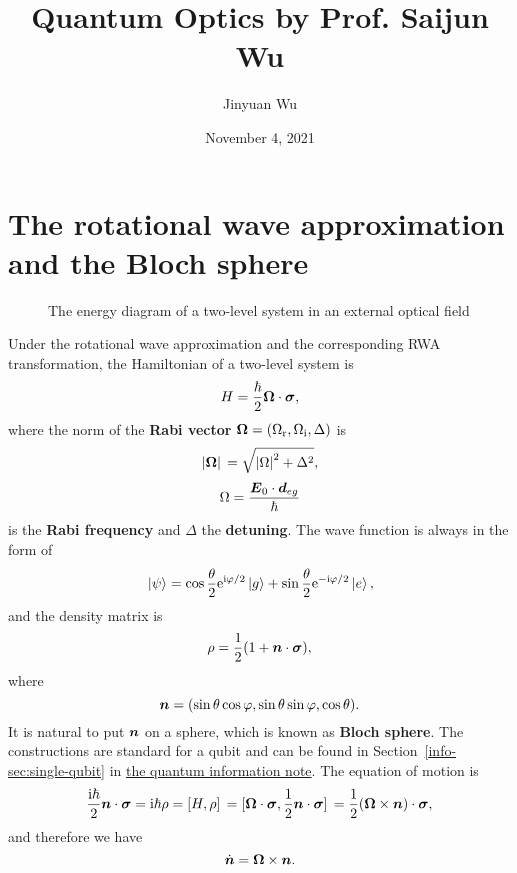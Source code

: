 \documentclass[hyperref, a4paper]{article}
\title{Quantum Optics by Prof. Saijun Wu}
\author{Jinyuan Wu}
\date{November 4, 2021}
\newcommand*{\ii}{\mathrm{i}}
\newcommand*{\ee}{\mathrm{e}}
\newcommand*{\concept}[1]{{\textbf{#1}}}
\newcommand{\infodoc}{\href{../information/quantum-circuit}{the quantum information note}}
\begin{document}
\maketitle

\section{The rotational wave approximation and the Bloch sphere}

\begin{figure}
    \centering
    
    \caption{The energy diagram of a two-level system in an external optical field}
\end{figure}

Under the rotational wave approximation and the corresponding RWA transformation, the Hamiltonian of a two-level system is 
\begin{equation}
    H = \frac{\hbar}{2} \vb*{\Omega} \cdot \vb*{\sigma},
    \label{eq:rwa-hamiltonian}
\end{equation}
where the norm of the \concept{Rabi vector} $\vb*{\Omega} = (\Omega_\text{r}, \Omega_\text{i} , \Delta)$ is
\begin{equation}
    \abs*{\vb*{\Omega}} = \sqrt{\abs{\Omega}^2 + \Delta^2},
\end{equation}
\begin{equation}
    \Omega = \frac{\vb*{E}_0 \cdot \vb*{d}_{eg}}{\hbar}
    \label{eq:rabi-freq}
\end{equation}
is the \concept{Rabi frequency} and $\Delta$ the \concept{detuning}.
The wave function is always in the form of 
\begin{equation}
    \ket*{\psi} = \cos \frac{\theta}{2} \ee^{\ii \varphi /2 } \ket*{g} + \sin \frac{\theta}{2} \ee^{- \ii \varphi / 2} \ket*{e}, 
\end{equation}
and the density matrix is 
\begin{equation}
    \rho = \frac{1}{2} (1 + \vb*{n} \cdot \vb*{\sigma}),
\end{equation}
where 
\begin{equation}
    \vb*{n} = (\sin \theta \cos \varphi, \sin \theta \sin \varphi, \cos \theta).
\end{equation}
It is natural to put $\vb*{n}$ on a sphere, which is known as \concept{Bloch sphere}.
The constructions are standard for a qubit and can be found in Section~\ref{info-sec:single-qubit} in \infodoc.
The equation of motion is 
\[
    \frac{\ii \hbar}{2} \vb*{n} \cdot \vb*{\sigma} = \ii \hbar \rho = \comm*{H}{\rho} = \comm*{\vb*{\Omega} \cdot \vb*{\sigma}}{\frac{1}{2} \vb*{n} \cdot \vb*{\sigma}} = \frac{1}{2} (\vb*{\Omega} \times \vb*{n}) \cdot \vb*{\sigma},
\]
and therefore we have 
\begin{equation}
    \dot{\vb*{n}} = \vb*{\Omega} \times \vb*{n}. 
    \label{eq:n-eom}
\end{equation}
\end{document}
